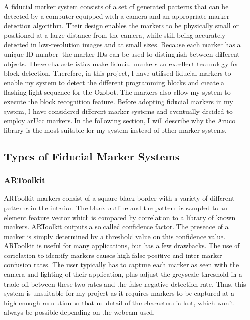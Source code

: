 \documentclass[oneside,%
                    author={Malak Hajji},
                    degree={BSc},
                    title={Designing An Accessible Computational Toolkit For Students},
                  subtitle={With Mixed Visual Abilities}]{dissertation}
\begin{document}
A fiducial marker system consists of a set of generated patterns that can be detected by a computer equipped with a camera and an appropriate marker detection algorithm.  Their design enables the markers to be physically small or positioned at a large distance from the camera, while still being accurately detected in low-resolution images and at small sizes. Because each marker has a unique ID number, the marker IDs can be used to distinguish between different objects. These characteristics make fiducial markers an excellent technology for block detection. 
Therefore, in this project, I have utilised fiducial markers to enable my system to detect the different programming blocks and create a flashing light sequence for the Ozobot. The markers also allow my system to execute the block recognition feature.  Before adopting fiducial markers in my system, I have considered different marker systems and eventually decided to employ arUco markers. In the following section, I will describe why the Aruco library is the most suitable for my system instead of other marker systems.

\subsection{Types of Fiducial Marker Systems}
\subsubsection{ARToolkit}
ARToolkit\cite{artoolkit} markers consist of a square black border with a variety of different patterns in the interior. The  black outline and the pattern is sampled to an element feature vector which is compared by correlation to a library of known markers. ARToolkit outputs a so called confidence factor. The presence of a marker is simply determined by a threshold value on this confidence value.
ARToolkit is useful for many applications, but has a few drawbacks. The use of correlation to identify markers causes high false positive and inter-marker confusion rates. The user typically has to capture each marker as seen with the camera and lighting of their application, plus adjust the greyscale threshold in a trade off between these two rates and the false negative detection rate. Thus, this system is unsuitable for my project as it requires markers to be captured at a high enough resolution so that no detail of the characters is lost, which won't always be possible depending on the webcam used.
\end{document}
